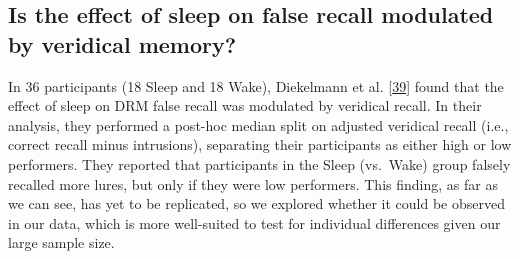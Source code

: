 \documentclass[
]{article}
\begin{document}
\hypertarget{is-the-effect-of-sleep-on-false-recall-modulated-by-veridical-memory}{%
\subsection{Is the effect of sleep on false recall modulated by veridical memory?}\label{is-the-effect-of-sleep-on-false-recall-modulated-by-veridical-memory}}

In 36 participants (18 Sleep and 18 Wake), Diekelmann et al. {[}\protect\hyperlink{ref-diekelmann2010a}{39}{]} found that the effect of sleep on DRM false recall was modulated by veridical recall. In their analysis, they performed a post-hoc median split on adjusted veridical recall (i.e., correct recall minus intrusions), separating their participants as either high or low performers. They reported that participants in the Sleep (vs.~Wake) group falsely recalled more lures, but only if they were low performers. This finding, as far as we can see, has yet to be replicated, so we explored whether it could be observed in our data, which is more well-suited to test for individual differences given our large sample size.
\end{document}
